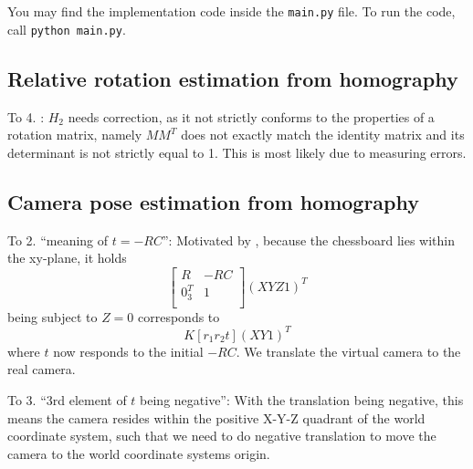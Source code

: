 \documentclass[a4paper, twoside, english]{article}
\begin{document}
You may find the implementation code inside the \lstinline{main.py} file. To run the code, call \lstinline{python main.py}.

\subsection{Relative rotation estimation from homography}

To 4. : $H_2$ needs correction, as it not strictly conforms to the properties of a rotation matrix, namely $MM^T$ does not exactly match the identity matrix and its determinant is not strictly equal to 1. This is most likely due to measuring errors. 

\subsection{Camera pose estimation from homography}

To 2. ``meaning of $t = -RC$'': Motivated by \cite{EpixeaT-RC}, because the chessboard lies within the xy-plane, it holds 
\begin{equation}
	[K|0_3]
	\begin{bmatrix}
		R	& -RC \\
		0_3^T	& 1 \\
	\end{bmatrix} (X Y Z 1)^T
\end{equation}
being subject to $Z = 0$ corresponds to
\begin{equation}
	K[r_1 r_2 t] (X Y 1)^T
\end{equation}
where $t$ now responds to the initial $-RC$. We translate the virtual camera to the real camera.

To 3. ``3rd element of $t$ being negative'': With the translation being negative, this means the camera resides within the positive X-Y-Z quadrant of the world coordinate system, such that we need to do negative translation to move the camera to the world coordinate systems origin.



\end{document}
